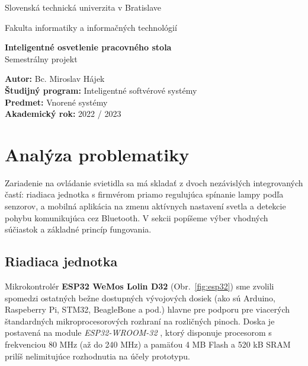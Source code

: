 \documentclass[12pt, a4paper]{article}
\begin{document}
\begin{titlepage}
{\centering
    {\Large Slovenská technická univerzita v Bratislave}\par
    {\Large Fakulta informatiky a informačných technológií}\par
    \vspace{\medskipamount}
    \vfill
    \LARGE \textbf{Inteligentné osvetlenie pracovného stola} \\
    \vspace{0.7\bigskipamount}
    {\Large Semestrálny projekt}\par
    \vfill
}
\normalsize    
\begin{flushleft}
\textbf{Autor:} Bc. Miroslav Hájek \\
\textbf{Študijný program:} Inteligentné softvérové systémy \\
\textbf{Predmet:} Vnorené systémy \\
\textbf{Akademický rok:} 2022 / 2023 \\
\end{flushleft}
\end{titlepage}

\thispagestyle{empty}


\tableofcontents
\newpage

\setcounter{page}{1}

\section{Analýza problematiky}
Zariadenie na ovládanie svietidla sa má skladať z dvoch nezávislých integrovaných častí: riadiaca jednotka s firmvérom priamo regulujúca spínanie lampy podľa senzorov, a mobilná aplikácia na zmenu aktívnych nastavení svetla a detekcie pohybu komunikujúca cez Bluetooth. V sekcii popíšeme výber vhodných súčiastok a základné princíp fungovania.

\subsection{Riadiaca jednotka}
Mikrokontrolér \textbf{ESP32 WeMos Lolin D32} (Obr.~\ref{fig:esp32}) sme zvolili spomedzi ostatných bežne dostupných vývojových dosiek (ako sú Arduino, Raspeberry Pi, STM32, BeagleBone a pod.) hlavne pre podporu pre viacerých štandardných mikroprocesorových rozhraní na rozličných pinoch. Doska je postavená na module \emph{ESP32-WROOM-32} \cite{noauthor_esp32-wroom-32_2023}, ktorý disponuje procesorom s frekvenciou 80 MHz (až do 240 MHz) a pamäťou 4 MB Flash a 520 kB SRAM prilíš nelimitujúce rozhodnutia na účely prototypu. 
\end{document}
